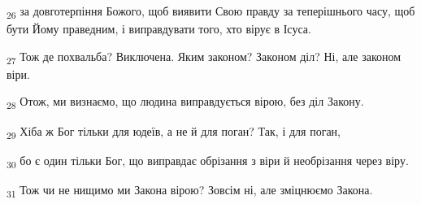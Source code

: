 \begin{tcolorbox}
\textsubscript{26} за довготерпіння Божого, щоб виявити Свою правду за теперішнього часу, щоб бути Йому праведним, і виправдувати того, хто вірує в Ісуса.
\end{tcolorbox}
\begin{tcolorbox}
\textsubscript{27} Тож де похвальба? Виключена. Яким законом? Законом діл? Ні, але законом віри.
\end{tcolorbox}
\begin{tcolorbox}
\textsubscript{28} Отож, ми визнаємо, що людина виправдується вірою, без діл Закону.
\end{tcolorbox}
\begin{tcolorbox}
\textsubscript{29} Хіба ж Бог тільки для юдеїв, а не й для поган? Так, і для поган,
\end{tcolorbox}
\begin{tcolorbox}
\textsubscript{30} бо є один тільки Бог, що виправдає обрізання з віри й необрізання через віру.
\end{tcolorbox}
\begin{tcolorbox}
\textsubscript{31} Тож чи не нищимо ми Закона вірою? Зовсім ні, але зміцнюємо Закона.
\end{tcolorbox}
